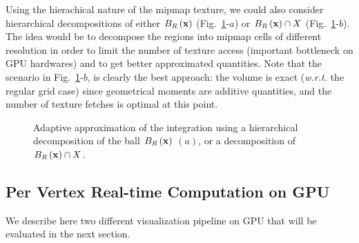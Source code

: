 \documentclass{llncs}
\newcommand{\wrt}{\emph{w.r.t.} }
\begin{document}
Using the hierachical nature of the mipmap texture, we could also
consider hierarchical decompositions of either $B_{R}\left(\mathbf{x}\right)$
(Fig.~\ref{fig:approx2}-$a$) or $B_{R}\left(\mathbf{x}\right)\cap X$
(Fig.~\ref{fig:approx2}-$b$). The idea would be to decompose the
regions into mipmap cells of different resolution in order to limit
the number of texture access (important bottleneck on GPU hardwares)
and to get better approximated quantities. Note that the scenario in
Fig.~\ref{fig:approx2}-$b$, is clearly the best approach: the
volume is exact  (\wrt the regular grid case) since geometrical moments
are additive quantities, and the number of texture fetches is  optimal
at this point.


\begin{figure}
  \begin{center}
  \end{center}
  \caption{Adaptive approximation of the integration using a
    hierarchical decomposition of the ball $B_{R}\left(\mathbf{x}\right)$ $(a)$, or a decomposition of $B_{R}\left(\mathbf{x}\right)\cap X$.}
  \label{fig:approx2}
\end{figure}


\subsection{Per Vertex Real-time Computation on GPU}

We describe here two different visualization pipeline on GPU that will
be evaluated in the next section.
\end{document}
